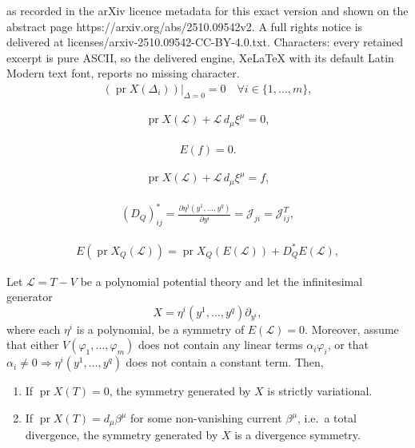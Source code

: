 \documentclass[10pt,a4paper]{amsart}
\newcommand{\mc}{\mathcal}
\newcommand{\on}{\operatorname}
\begin{document}
as recorded in the arXiv licence metadata for this exact version and shown on the abstract page https://arxiv.org/abs/2510.09542v2. A full rights notice is delivered at licenses/arxiv-2510.09542-CC-BY-4.0.txt. Characters: every retained excerpt is pure ASCII, so the delivered engine, XeLaTeX with its default Latin Modern text font, reports no missing character.
\begin{align}\label{E:prDelta=0PDEsymCond}
	 (\on{pr}X(\Delta_i))|_{\Delta = 0}=0 \quad \forall i\in \{1,\ldots,m\},  
\end{align}

\begin{align}\label{E:condStrictVarSym}
	\on{pr}X(\mc{L})+\mc{L}\,{d_\mu \xi^\mu}=0,
\end{align}

\begin{align}\label{E:EtotDiv}
	E(f)=0.
\end{align}

\begin{align}\label{E:divSymmetry}
	\on{pr}X(\mc{L})+\mc{L}\,d_\mu \xi^\mu=f,
\end{align}

\begin{align}\label{E:adjFrechetScAff}
	(D_Q)_{ij}^\ast=  \frac{\partial \eta^j(y^1,\ldots,y^{q})}{\partial y^i}=\mc{J}_{ji}=\mc{J}^T_{ij},
\end{align}

\begin{align}\label{E:commFrechet}
	E(\on{pr}X_Q(\mc{L}))=\on{pr}X_Q(E(\mc{L}))+D_Q^\ast E(\mc{L}),
\end{align}

\begin{theorem}\label{P:prXannTannV}
Let $\mc{L}=T-V$ be a polynomial potential theory and let the infinitesimal generator 
\[
X=\eta^i(y^1,\ldots,y^{q})\partial_{y^i}, 
\]
where each $\eta^i$ is a polynomial, be a symmetry of $E(\mc{L})=0$. Moreover, assume that either $V(\varphi_1,\ldots,\varphi_m)$ does not contain any linear terms $\alpha_i \varphi_i$, or that
 $\alpha_i\ne 0 \Rightarrow \eta^i(y^1,\ldots,y^{q})$ does not
contain a constant term.
Then,   
\begin{enumerate}[label=(\roman*)]
 \item If $\on{pr}X(T)=0$, the symmetry generated by $X$ is strictly variational.
  \item If $\on{pr}X(T)=d_\mu \beta^\mu$ for some non-vanishing current $\beta^\mu$, i.e.~a total divergence, 
        the symmetry generated by $X$ is a divergence symmetry.
\end{enumerate}
\end{theorem}
\end{document}
